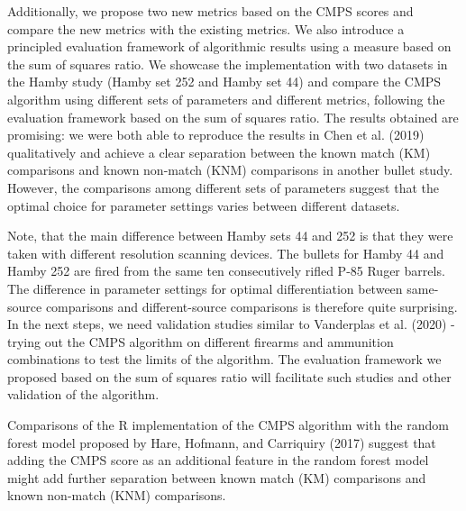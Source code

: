 Additionally, we propose two new metrics based on the CMPS scores and compare the new metrics with the existing metrics.
We also introduce a principled evaluation framework of algorithmic results using a measure based on the sum of squares ratio.
We showcase the implementation with two datasets in the Hamby study (Hamby set 252 and Hamby set 44) and compare the CMPS algorithm using different sets of parameters and different metrics, following the evaluation framework based on the sum of squares ratio.
The results obtained are promising: we were both able to reproduce the results in Chen et al. (2019) qualitatively and achieve a clear separation between the known match (KM) comparisons and known non-match (KNM) comparisons in another bullet study.
However, the comparisons among different sets of parameters suggest that the optimal choice for parameter settings varies between different datasets.

Note, that the main difference between Hamby sets 44 and 252 is that they were taken with different resolution scanning devices. The bullets for Hamby 44 and Hamby 252 are fired from the same ten consecutively rifled P-85 Ruger barrels. The difference in parameter settings for optimal differentiation between same-source comparisons and different-source comparisons is therefore quite surprising. In the next steps, we need validation studies similar to Vanderplas et al. (2020) - trying out the CMPS algorithm on different firearms and ammunition combinations to test the limits of the algorithm. The evaluation framework we proposed based on the sum of squares ratio will facilitate such studies and other validation of the algorithm.

Comparisons of the R implementation of the CMPS algorithm with the random forest model proposed by Hare, Hofmann, and Carriquiry (2017) suggest that adding the CMPS score as an additional feature in the random forest model might add further separation between known match (KM) comparisons and known non-match (KNM) comparisons.

